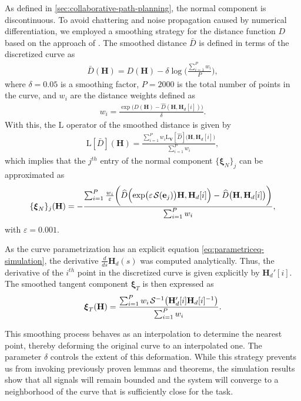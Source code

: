 As defined in \cref{sec:collaborative-path-planning}, the normal component is discontinuous. To avoid chattering and noise propagation caused by numerical differentiation, we employed a smoothing strategy for the distance function $D$ based on the approach of \citet{Goncalves2024}. The smoothed distance $\bar{D}$ is defined in terms of the discretized curve as
\begin{align}
    \bar{D}(\mathbf{H}) = D(\mathbf{H}) - \delta\log\biggl(\frac{\sum_{i=1}^{P}w_i}{P}\biggr),
\end{align}
where $\delta=0.05$ is a smoothing factor, $P=\num{2000}$ is the total number of points in the curve, and $w_i$ are the distance weights defined as
\begin{align}
    w_i = \frac{\exp\bigl(D(\mathbf{H}) - \widehat{D}(\mathbf{H}, \mathbf{H}_d[i])\bigr)}{\delta}.
\end{align}
With this, the $\text{L}$ operator of the smoothed distance is given by
\begin{align}
    \text{L}[\bar{D}](\mathbf{H}) = \frac{\sum_{i=1}^{P}w_i\text{L}_\mathbf{V}[\widehat{D}]\bigl(\mathbf{H}, \mathbf{H}_d[i]\bigr)}{\sum_{i=1}^{P}w_i},
\end{align}
which implies that the $j^{th}$ entry of the normal component $\{\boldsymbol{\xi}_{N}\}_{j}$ can be approximated as
\begin{align}
    \{\boldsymbol{\xi}_{N}\}_{j}(\mathbf{H}) = -\frac{\sum_{i=1}^{P} \frac{w_i}{\varepsilon}\biggl(\widehat{D}\Bigl(\exp\bigl(\varepsilon\SL[\mathbf{e}_j]\bigr)\mathbf{H}, \mathbf{H}_d[i]\Bigr)- \widehat{D}\bigl(\mathbf{H}, \mathbf{H}_d[i]\bigr)\biggr)}{\sum_{i=1}^{P}w_i},
\end{align}
with $\varepsilon=0.001$.

As the curve parametrization has an explicit equation \eqref{eq:parametriceq-simulation}, the derivative $\frac{d}{ds}\mathbf{H}_d(s)$ was computed analytically. Thus, the derivative of the $i^{th}$ point in the discretized curve is given explicitly by $\mathbf{H}_d'[i]$. The smoothed tangent component $\boldsymbol{\xi}_T$ is then expressed as
\begin{align}
    \boldsymbol{\xi}_T(\mathbf{H}) = \frac{\sum_{i=1}^{P} w_i\invSL\bigl(\mathbf{H}_d'[i]\mathbf{H}_d[i]^{-1}\bigr)}{\sum_{i=1}^{P} w_i}.
\end{align}

This smoothing process behaves as an interpolation to determine the nearest point, thereby deforming the original curve to an interpolated one. The parameter $\delta$ controls the extent of this deformation. While this strategy prevents us from invoking previously proven lemmas and theorems, the simulation results show that all signals will remain bounded and the system will converge to a neighborhood of the curve that is sufficiently close for the task.

